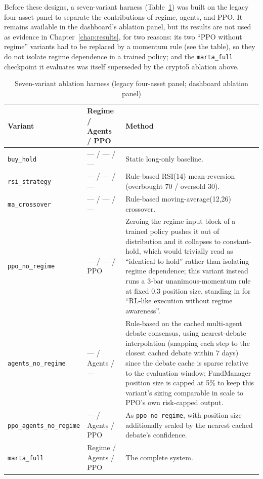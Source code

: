 Before these designs, a seven-variant harness (Table~\ref{tab:ablation-variants}) was built on the legacy four-asset panel to separate the contributions of regime, agents, and PPO. It remains available in the dashboard's ablation panel, but its results are not used as evidence in Chapter~\ref{chap:results}, for two reasons: its two ``PPO without regime'' variants had to be replaced by a momentum rule (see the table), so they do not isolate regime dependence in a trained policy; and the \texttt{marta\_full} checkpoint it evaluates was itself superseded by the crypto5 ablation above.

\begin{table}[H]
\centering
\small
\caption{Seven-variant ablation harness (legacy four-asset panel; dashboard ablation panel)}
\label{tab:ablation-variants}
\begin{tabular}{|l|>{\centering\arraybackslash}p{2.2cm}|p{7.2cm}|}
\hline
\textbf{Variant} & \textbf{Regime / Agents / PPO} & \textbf{Method} \\
\hline
\texttt{buy\_hold} & --- / --- / --- & Static long-only baseline. \\
\hline
\texttt{rsi\_strategy} & --- / --- / --- & Rule-based RSI(14) mean-reversion (overbought 70 / oversold 30). \\
\hline
\texttt{ma\_crossover} & --- / --- / --- & Rule-based moving-average(12,26) crossover. \\
\hline
\texttt{ppo\_no\_regime} & --- / --- / PPO & Zeroing the regime input block of a trained policy pushes it out of distribution and it collapses to constant-hold, which would trivially read as ``identical to hold'' rather than isolating regime dependence; this variant instead runs a 3-bar unanimous-momentum rule at fixed 0.3 position size, standing in for ``RL-like execution without regime awareness''. \\
\hline
\texttt{agents\_no\_regime} & --- / Agents / --- & Rule-based on the cached multi-agent debate consensus, using nearest-debate interpolation (snapping each step to the closest cached debate within 7 days) since the debate cache is sparse relative to the evaluation window; FundManager position size is capped at 5\% to keep this variant's sizing comparable in scale to PPO's own risk-capped output. \\
\hline
\texttt{ppo\_agents\_no\_regime} & --- / Agents / PPO & As \texttt{ppo\_no\_regime}, with position size additionally scaled by the nearest cached debate's confidence. \\
\hline
\texttt{marta\_full} & Regime / Agents / PPO & The complete system. \\
\hline
\end{tabular}
\normalsize
\end{table}


